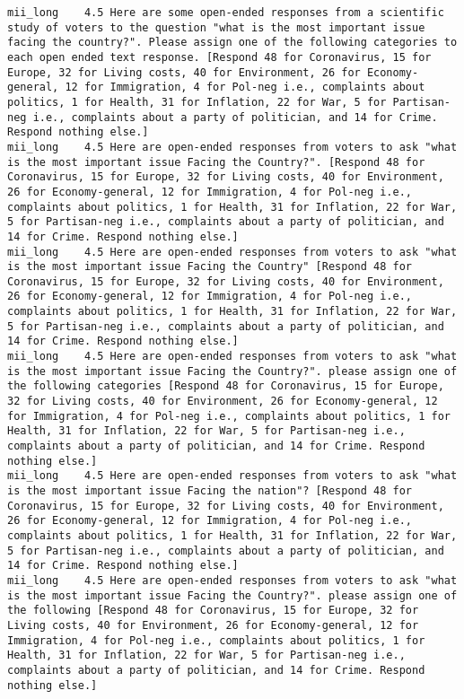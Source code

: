 \begin{lstlisting}[label=lst:promptvariants]
mii_long	4.5	Here are some open-ended responses from a scientific study of voters to the question "what is the most important issue facing the country?". Please assign one of the following categories to each open ended text response. [Respond 48 for Coronavirus, 15 for Europe, 32 for Living costs, 40 for Environment, 26 for Economy-general, 12 for Immigration, 4 for Pol-neg i.e., complaints about politics, 1 for Health, 31 for Inflation, 22 for War, 5 for Partisan-neg i.e., complaints about a party of politician, and 14 for Crime. Respond nothing else.]
mii_long	4.5	Here are open-ended responses from voters to ask "what is the most important issue Facing the Country?". [Respond 48 for Coronavirus, 15 for Europe, 32 for Living costs, 40 for Environment, 26 for Economy-general, 12 for Immigration, 4 for Pol-neg i.e., complaints about politics, 1 for Health, 31 for Inflation, 22 for War, 5 for Partisan-neg i.e., complaints about a party of politician, and 14 for Crime. Respond nothing else.]
mii_long	4.5	Here are open-ended responses from voters to ask "what is the most important issue Facing the Country" [Respond 48 for Coronavirus, 15 for Europe, 32 for Living costs, 40 for Environment, 26 for Economy-general, 12 for Immigration, 4 for Pol-neg i.e., complaints about politics, 1 for Health, 31 for Inflation, 22 for War, 5 for Partisan-neg i.e., complaints about a party of politician, and 14 for Crime. Respond nothing else.]
mii_long	4.5	Here are open-ended responses from voters to ask "what is the most important issue Facing the Country?". please assign one of the following categories [Respond 48 for Coronavirus, 15 for Europe, 32 for Living costs, 40 for Environment, 26 for Economy-general, 12 for Immigration, 4 for Pol-neg i.e., complaints about politics, 1 for Health, 31 for Inflation, 22 for War, 5 for Partisan-neg i.e., complaints about a party of politician, and 14 for Crime. Respond nothing else.]
mii_long	4.5	Here are open-ended responses from voters to ask "what is the most important issue Facing the nation"? [Respond 48 for Coronavirus, 15 for Europe, 32 for Living costs, 40 for Environment, 26 for Economy-general, 12 for Immigration, 4 for Pol-neg i.e., complaints about politics, 1 for Health, 31 for Inflation, 22 for War, 5 for Partisan-neg i.e., complaints about a party of politician, and 14 for Crime. Respond nothing else.]
mii_long	4.5	Here are open-ended responses from voters to ask "what is the most important issue Facing the Country?". please assign one of the following [Respond 48 for Coronavirus, 15 for Europe, 32 for Living costs, 40 for Environment, 26 for Economy-general, 12 for Immigration, 4 for Pol-neg i.e., complaints about politics, 1 for Health, 31 for Inflation, 22 for War, 5 for Partisan-neg i.e., complaints about a party of politician, and 14 for Crime. Respond nothing else.]

\end{lstlisting}
